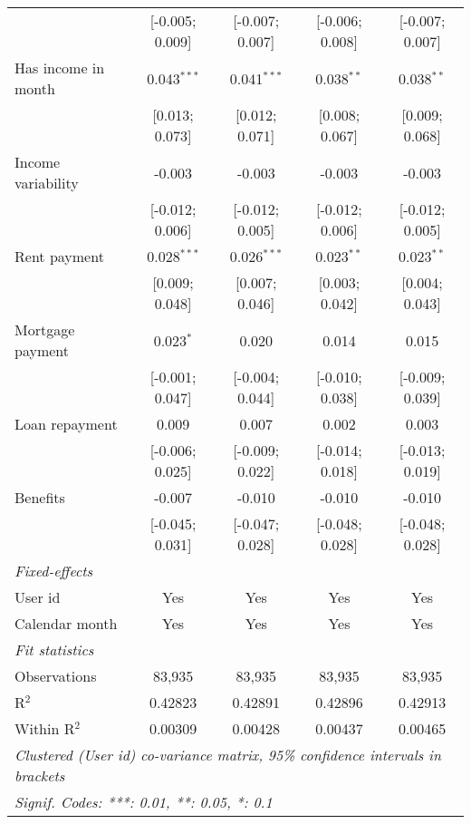 \begin{table}[htbp]
\begin{threeparttable}[b]
\begin{tabular}{lcccc}
                                   & [-0.005; 0.009]  & [-0.007; 0.007] & [-0.006; 0.008]  & [-0.007; 0.007]\\   
         Has income in month       & 0.043$^{***}$    & 0.041$^{***}$   & 0.038$^{**}$     & 0.038$^{**}$\\   
                                   & [0.013; 0.073]   & [0.012; 0.071]  & [0.008; 0.067]   & [0.009; 0.068]\\   
         Income variability        & -0.003           & -0.003          & -0.003           & -0.003\\   
                                   & [-0.012; 0.006]  & [-0.012; 0.005] & [-0.012; 0.006]  & [-0.012; 0.005]\\   
         Rent payment              & 0.028$^{***}$    & 0.026$^{***}$   & 0.023$^{**}$     & 0.023$^{**}$\\   
                                   & [0.009; 0.048]   & [0.007; 0.046]  & [0.003; 0.042]   & [0.004; 0.043]\\   
         Mortgage payment          & 0.023$^{*}$      & 0.020           & 0.014            & 0.015\\   
                                   & [-0.001; 0.047]  & [-0.004; 0.044] & [-0.010; 0.038]  & [-0.009; 0.039]\\   
         Loan repayment            & 0.009            & 0.007           & 0.002            & 0.003\\   
                                   & [-0.006; 0.025]  & [-0.009; 0.022] & [-0.014; 0.018]  & [-0.013; 0.019]\\   
         Benefits                  & -0.007           & -0.010          & -0.010           & -0.010\\   
                                   & [-0.045; 0.031]  & [-0.047; 0.028] & [-0.048; 0.028]  & [-0.048; 0.028]\\   
         \midrule
         \emph{Fixed-effects}\\
         User id                   & Yes              & Yes             & Yes              & Yes\\  
         Calendar month            & Yes              & Yes             & Yes              & Yes\\  
         \midrule
         \emph{Fit statistics}\\
         Observations              & 83,935           & 83,935          & 83,935           & 83,935\\  
         R$^2$                     & 0.42823          & 0.42891         & 0.42896          & 0.42913\\  
         Within R$^2$              & 0.00309          & 0.00428         & 0.00437          & 0.00465\\  
         \midrule \midrule
         \multicolumn{5}{l}{\emph{Clustered (User id) co-variance matrix, 95\% confidence intervals in brackets}}\\
         \multicolumn{5}{l}{\emph{Signif. Codes: ***: 0.01, **: 0.05, *: 0.1}}\\
      \end{tabular}
      

\end{threeparttable}
\end{table}
